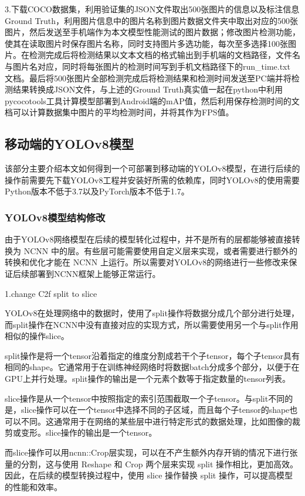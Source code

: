 \documentclass{ctexart}
\numberwithin{equation}{section}%
\numberwithin{figure}{section}%
\numberwithin{table}{section}%
\begin{document}
	3.下载COCO数据集，利用验证集的JSON文件取出500张图片的信息以及标注信息Ground Truth，利用图片信息中的图片名称到图片数据文件夹中取出对应的500张图片，然后发送至手机端作为本文模型性能测试的图片数据；修改图片检测功能，使其在读取图片时保存图片名称，同时支持图片多选功能，每次至多选择100张图片。在检测完成后将检测结果以文本文档的格式输出到手机端的文档路径，文件名与图片名对应，同时将每张图片的检测时间写到手机文档路径下的run\_time.txt
	文档。最后将500张图片全部检测完成后将检测结果和检测时间发送至PC端并将检测结果转换成JSON文件，与上述的Ground Truth真实值一起在python中利用pycocotools工具计算模型部署到Android端的mAP值，然后利用保存检测时间的文档可以计算数据集中图片的平均检测时间，并将其作为FPS值。
	
	\subsection{移动端的YOLOv8模型}
	该部分主要介绍本文如何得到一个可部署到移动端的YOLOv8模型，在进行后续的操作前需要先下载YOLOv8工程并安装好所需的依赖库，同时YOLOv8的使用需要Python版本不低于3.7以及PyTorch版本不低于1.7。
	
	\subsubsection{YOLOv8模型结构修改}
	由于YOLOv8网络模型在后续的模型转化过程中，并不是所有的层都能够被直接转换为 NCNN 中的层。有些层可能需要使用自定义层来实现，或者需要进行额外的转换和优化才能在 NCNN 上运行。所以需要对YOLOv8的网络进行一些修改来保证后续部署到NCNN框架上能够正常运行。
	
	1.change C2f split to slice
	
	YOLOv8在处理网络中的数据时，使用了split操作将数据分成几个部分进行处理，而split操作在NCNN中没有直接对应的实现方式，所以需要使用另一个与split作用相似的操作slice。
	
	split操作是将一个tensor沿着指定的维度分割成若干个子tensor，每个子tensor具有相同的shape。它通常用于在训练神经网络时将数据batch分成多个部分，以便于在GPU上并行处理。split操作的输出是一个元素个数等于指定数量的tensor列表。
	
	slice操作是从一个tensor中按照指定的索引范围截取一个子tensor。与split不同的是，slice操作可以在一个tensor中选择不同的子区域，而且每个子tensor的shape也可以不同。这通常用于在网络的某些层中进行特定形式的数据处理，比如图像的裁剪或变形。slice操作的输出是一个tensor。
	
	而slice操作可以用ncnn::Crop层实现，可以在不产生额外内存开销的情况下进行张量的分割，这与使用 Reshape 和 Crop 两个层来实现 split 操作相比，更加高效。因此，在后续的模型转换过程中，使用 slice 操作替换 split 操作，可以提高模型的性能和效率。
	
\end{document}
